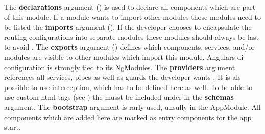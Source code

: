 The \textbf{declarations} argument () is used to declare all components which are part of this module. If a module wants to import other modules those modules need to be listed  the \textbf{imports} argument (). If the developer chooses to encapsulate the routing configurations into separate modules these modules should always be last to avoid . The \textbf{exports} argument () defines which components, services, and/or modules are visible to other modules which import this module. Angulars \gls{di} configuration is strongly tied to its NgModules. The \textbf{providers} argument references all services, pipes as well as guards the developer wants . It is als possible to use interception, which has to be defined here as well. To be able to use custom \gls{html} tags (see ) the  musst be included under in the \textbf{schemas} argument. The \textbf{bootstrap} argument is rarly used, unsully in the AppModule. All components which are added here are marked as entry components for the app start. 
